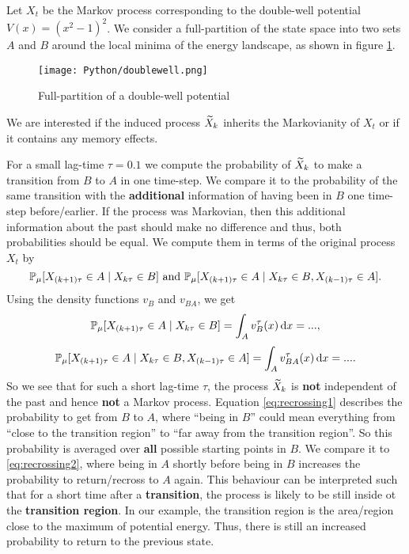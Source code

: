Let $X_t$ be the Markov process corresponding to the double-well potential $V(x) = (x^2-1)^2$. We consider a full-partition of the state space into two sets $A$ and $B$ around the local minima of the energy landscape, as shown in figure \ref{fig:doublewell}.
\begin{figure}[!ht]
	\centering
	\texttt{[image: Python/doublewell.png]} %
	\caption{Full-partition of a double-well potential}
	\label{fig:doublewell}
\end{figure}
We are interested if the induced process $\widetilde{X}_k$ inherits the Markovianity of $X_t$ or if it contains any memory effects.

For a small lag-time $\tau = 0.1$ we compute the probability of $\widetilde{X}_k$ to make a transition from $B$ to $A$ in one time-step. We compare it to the probability of the same transition with the \textbf{additional} information of having been in $B$ one time-step before/earlier. If the process was Markovian, then this additional information about the past should make no difference and thus, both probabilities should be equal.
We compute them in terms of the original process $X_t$ by
\begin{equation*}
\mathbb{P}_\mu[X_{(k+1)\tau} \in A \mid X_{k\tau} \in B] \textrm{ and }
\mathbb{P}_\mu[X_{(k+1)\tau} \in A \mid X_{k\tau} \in B, X_{(k-1)\tau} \in A].
\end{equation*}
Using the density functions $v_B$ and $v_{BA}$, we get 
\begin{equation}
\label{eq:recrossing1}
\mathbb{P}_\mu[X_{(k+1)\tau} \in A \mid X_{k\tau} \in B] = \int_A v_B^\tau(x) \mathop{}\!\mathrm{d} x = ... ,
\end{equation}
\begin{equation}
\label{eq:recrossing2}
\mathbb{P}_\mu[X_{(k+1)\tau} \in A \mid X_{k\tau} \in B, X_{(k-1)\tau} \in A] = \int_A v_{BA}^\tau(x) \mathop{}\!\mathrm{d} x = ... .
\end{equation}
So we see that for such a short lag-time $\tau$, the process $\widetilde{X}_k$ is \textbf{not} independent of the past  and hence \textbf{not} a Markov process.
Equation \eqref{eq:recrossing1} describes the probability to get from $B$ to $A$, where ``being in $B$'' could mean everything from ``close to the transition region'' to ``far away from the transition region''. So this probability is averaged over \textbf{all} possible starting points in $B$. 
We compare it to \eqref{eq:recrossing2}, where being in $A$ shortly before
being in $B$ increases the probability to return/recross to $A$ again.
This behaviour can be interpreted such that for a short time after a \textbf{transition}, the process is likely to be still inside ot the \textbf{transition region}.
In our example, the transition region is the area/region close to the maximum of potential energy. Thus, there is still an increased probability to return to the previous state.

